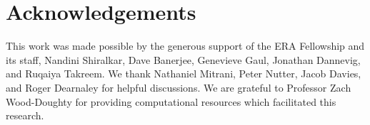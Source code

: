 \section*{Acknowledgements}
This work was made possible by the generous support of the ERA Fellowship and its staff, Nandini Shiralkar, Dave Banerjee, Genevieve Gaul, Jonathan Dannevig, and Ruqaiya Takreem.
We thank Nathaniel Mitrani, Peter Nutter, Jacob Davies, and Roger Dearnaley for helpful discussions.
We are grateful to Professor Zach Wood-Doughty for providing computational resources which facilitated this research.